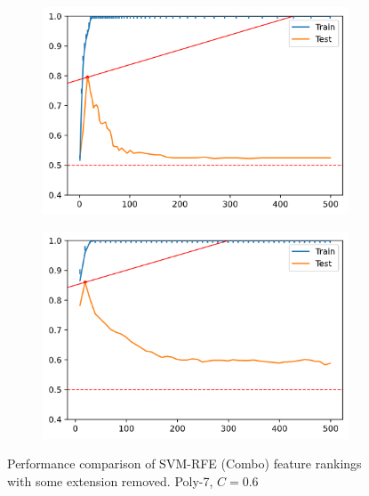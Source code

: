\begin{figure}[H]
    \centering
    \begin{subfigure}[b]{0.4\linewidth}
        \includegraphics[width=\linewidth]{img/ch5/combo/twice-2.png}
    \end{subfigure}
    \begin{subfigure}[b]{0.4\linewidth}
        \includegraphics[width=\linewidth]{img/ch5/combo/twice-3.png}
    \end{subfigure}
    \caption[Combo: Comparison for when using the old methods instead]{Performance comparison of SVM-RFE (Combo) feature rankings with some extension removed. Poly-7, $C=0.6$}
    \label{fig:ch5.combo.art.comp2}
\end{figure}

